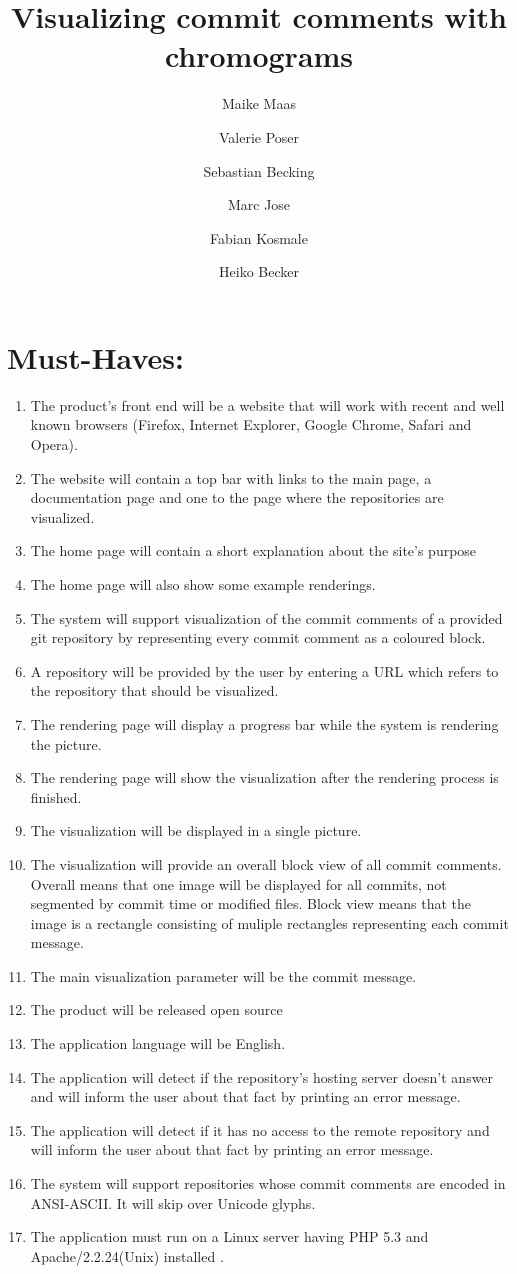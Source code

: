 \documentclass[12pt]{scrartcl}
\author{Maike Maas \and Valerie Poser \and Sebastian Becking
\and Marc Jose \and Fabian Kosmale  \and Heiko Becker}
\title{Visualizing commit comments with chromograms}
\begin{document}
\maketitle
\section{Must-Haves:}
\begin{enumerate}
\item The product's front end will be a website that will work with recent and well known browsers (Firefox, Internet Explorer, Google Chrome, Safari and Opera). 
\item The website will contain a top bar with links to the main page, a documentation page and one to the page where the repositories are visualized. 
\item The home page will contain a short explanation about the site's purpose
\item The home page will also show some example renderings.
\item The system will support visualization of the commit comments of a provided git repository by representing every commit comment as a coloured block.
\item A repository will be provided by the user by entering a URL which refers to the repository that should be visualized.
\item The rendering page will display a progress bar while the system is rendering the picture.
\item The rendering page will show the visualization after the rendering process is finished.
\item The visualization will be displayed in a single picture.
\item The visualization will provide an overall block view of all commit
	comments. Overall means that one image will be displayed for all
	commits, not segmented by commit time or modified files. Block view means
	that the image is a rectangle consisting of muliple rectangles
	representing each commit message.
\item The main visualization parameter will be the commit message.
\item The product will be released open source 
\item The application language will be English.
\item The application will detect if the repository's hosting server doesn't answer and will inform the user about that fact by printing an error message.
\item The application will detect if it has no access to the remote repository and will inform the user about that fact by printing an error message.
\item The system will support repositories whose commit comments are encoded in
	ANSI-ASCII. It will skip over Unicode glyphs.
\item The application must run on a Linux server having PHP 5.3 and
	Apache/2.2.24(Unix) installed .
\end{enumerate}
\end{document}
